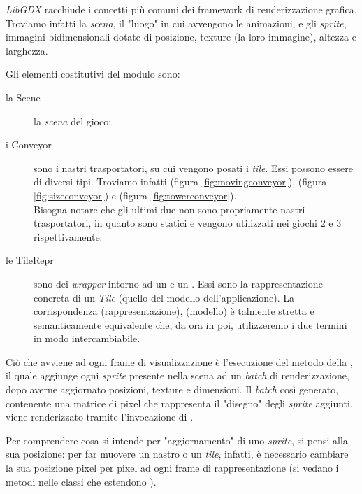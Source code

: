 \textit{LibGDX} racchiude i concetti più comuni dei framework di renderizzazione grafica. Troviamo infatti la \textit{scena}, il "luogo" in cui avvengono le animazioni, e gli \textit{sprite}, immagini bidimensionali dotate di posizione, texture (la loro immagine), altezza e larghezza.

Gli elementi costitutivi del modulo  sono:

\begin{description}
    \item[la Scene] la \textit{scena} del gioco;
    \item[i Conveyor] sono i nastri trasportatori, su cui vengono posati i \textit{tile}. Essi possono essere di diversi tipi. Troviamo infatti  (figura \ref{fig:movingconveyor}),  (figura \ref{fig:sizeconveyor}) e  (figura \ref{fig:towerconveyor}).\\
        Bisogna notare che gli ultimi due non sono propriamente nastri trasportatori, in quanto sono statici e vengono utilizzati nei giochi 2 e 3 rispettivamente.


    \item[le TileRepr] sono dei \textit{wrapper} intorno ad un  e un . Essi sono la rappresentazione concreta di un \textit{Tile} (quello del modello dell'applicazione). La corrispondenza  (rappresentazione),  (modello) è talmente stretta e semanticamente equivalente che, da ora in poi, utilizzeremo i due termini in modo intercambiabile.
\end{description}

Ciò che avviene ad ogni frame di visualizzazione è l'esecuzione del metodo  della , il quale aggiunge ogni \textit{sprite} presente nella scena ad un \textit{batch} di renderizzazione, dopo averne aggiornato posizioni, texture e dimensioni. Il \textit{batch} così generato, contenente una matrice di pixel che rappresenta il "disegno" degli \textit{sprite} aggiunti, viene renderizzato tramite l'invocazione di .

Per comprendere cosa si intende per "aggiornamento" di uno \textit{sprite}, si pensi alla sua posizione: per far muovere un nastro o un \textit{tile}, infatti, è necessario cambiare la sua posizione pixel per pixel ad ogni frame di rappresentazione (si vedano i metodi  nelle classi che estendono ).


